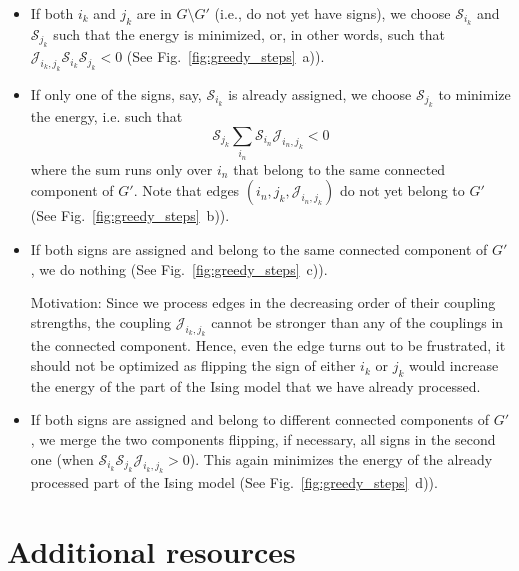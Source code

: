 \begin{itemize}[topsep=0pt, noitemsep]
    \item If both $i_k$ and $j_k$ are in $G\setminus G'$ (i.e.,  do not yet have signs), we choose $\mathcal{S}_{i_k}$ and $\mathcal{S}_{j_k}$ such that the energy is minimized, or, in other words, such that $\mathcal{J}_{i_k,j_k} \mathcal{S}_{i_k} \mathcal{S}_{j_k} < 0$ (See Fig.~\ref{fig:greedy_steps}~a)).
    
    \item If only one of the signs, say, $\mathcal{S}_{i_k}$ is already assigned, we choose $\mathcal{S}_{j_k}$ to minimize the energy, i.e. such that
    \begin{equation*}
        \mathcal{S}_{j_k}
            \sum_{i_n} \mathcal{S}_{i_n} \mathcal{J}_{i_n,j_k} < 0
    \end{equation*}
    where the sum runs only over $i_n$ that belong to the same connected component of $G'$. Note that edges $(i_n, j_k, \mathcal{J}_{i_n, j_k})$ do not yet belong to $G'$ (See Fig.~\ref{fig:greedy_steps}~b)).

    \item If both signs are assigned and belong to the same connected component of $G'$, we do nothing (See Fig.~\ref{fig:greedy_steps}~c)).    
    
    Motivation: Since we process edges in the decreasing order of their coupling strengths, the coupling $\mathcal{J}_{i_k, j_k}$ cannot be stronger than any of the couplings in the connected component. Hence, even the edge turns out to be frustrated, it should not be optimized as flipping the sign of either $i_k$ or $j_k$ would increase the energy of the part of the Ising model that we have already processed.
    
    \item If both signs are assigned and belong to different connected components of $G'$, we merge the two components flipping, if necessary, all signs in the second one (when $\mathcal{S}_{i_k} \mathcal{S}_{j_k} \mathcal{J}_{i_k,j_k} > 0$). This again minimizes the energy of the already processed part of the Ising model (See Fig.~\ref{fig:greedy_steps}~d)).
\end{itemize}

\section{Additional resources}

